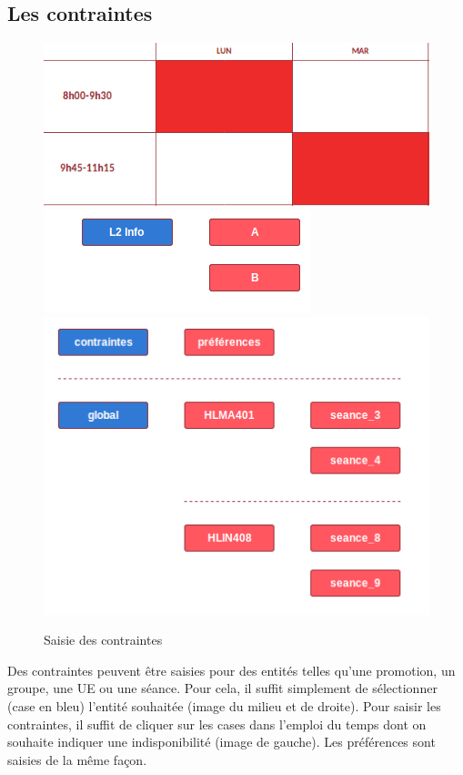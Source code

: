 \documentclass[12pt,a4paper,openany]{memoir}
\begin{document}
\subsection{Les contraintes}
\begin{figure}[H]
    \includegraphics[scale=0.3]{img/interfaces/contrainte.png}\hfill
    \includegraphics[scale=0.3]{img/interfaces/contrainte_promo.png}\hfill
    \includegraphics[scale=0.3]{img/interfaces/contrainte_ue.png}
    \caption{Saisie des contraintes} \medbreak
\end{figure}
\par
Des contraintes peuvent être saisies pour des entités telles qu'une promotion, un groupe, une UE ou une séance. Pour cela, il suffit simplement de sélectionner (case en bleu) l'entité souhaitée (image du milieu et de droite). Pour saisir les contraintes, il suffit de cliquer sur les cases dans l'emploi du temps dont on souhaite indiquer une indisponibilité (image de gauche). Les préférences sont saisies de la même façon.
\end{document}
